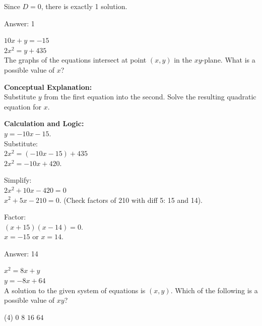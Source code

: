 \documentclass[11pt,paper=a4,answers]{exam}
\begin{document}
\begin{questions}
\begin{solution}
Since $D = 0$, there is exactly 1 solution.

\vspace{25pt}

Answer: \colorbox{yellow!100}{1}
\end{solution}

\vspace{40pt}

\question
$10x + y = -15$ \\
$2x^2 = y + 435$ \\
The graphs of the equations intersect at point $(x, y)$ in the $xy$-plane. What is a possible value of $x$?

\begin{solution}
\textbf{Conceptual Explanation:} \\
Substitute $y$ from the first equation into the second. Solve the resulting quadratic equation for $x$.

\vspace{20pt}

\textbf{Calculation and Logic:} \\
$y = -10x - 15$. \\
Substitute: \\
$2x^2 = (-10x - 15) + 435$ \\
$2x^2 = -10x + 420$.

\vspace{10pt}

Simplify: \\
$2x^2 + 10x - 420 = 0$ \\
$x^2 + 5x - 210 = 0$. (Check factors of 210 with diff 5: 15 and 14).

\vspace{10pt}

Factor: \\
$(x + 15)(x - 14) = 0$. \\
$x = -15$ or $x = 14$.

\vspace{25pt}

Answer: \colorbox{yellow!100}{14}
\end{solution}

\vspace{40pt}

\question
$x^2 = 8x + y$ \\
$y = -8x + 64$ \\
A solution to the given system of equations is $(x, y)$. Which of the following is a possible value of $xy$?
\begin{tasks}(4)
    \task $0$
    \task $8$
    \task $16$
    \task $64$
\end{tasks}


\end{questions}
\end{document}
